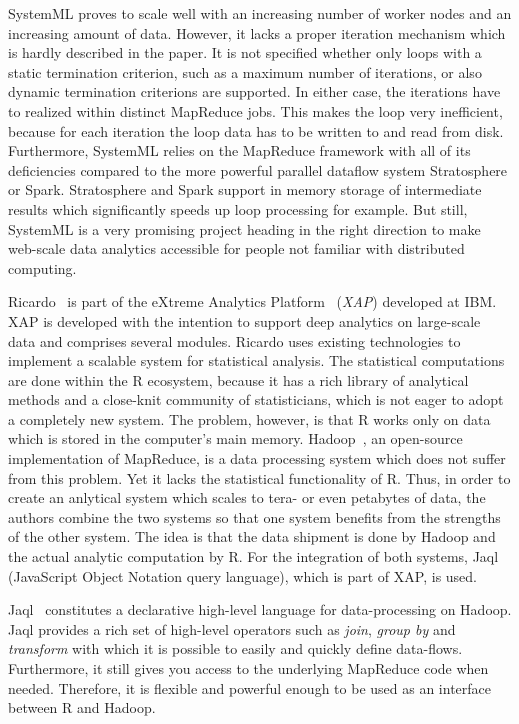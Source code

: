 SystemML proves to scale well with an increasing number of worker nodes and an increasing amount of data.
However, it lacks a proper iteration mechanism which is hardly described in the paper.
It is not specified whether only loops with a static termination criterion, such as a maximum number of iterations, or also dynamic termination criterions are supported.
In either case, the iterations have to realized within distinct MapReduce jobs.
This makes the loop very inefficient, because for each iteration the loop data has to be written to and read from disk.
Furthermore, SystemML relies on the MapReduce framework with all of its deficiencies compared to the more powerful parallel dataflow system Stratosphere or Spark.
Stratosphere and Spark support in memory storage of intermediate results which significantly speeds up loop processing for example.
But still, SystemML is a very promising project heading in the right direction to make web-scale data analytics accessible for people not familiar with distributed computing.

Ricardo~\cite{das:2010a} is part of the eXtreme Analytics Platform~\cite{balmin:jrd2013a} (\emph{XAP}) developed at IBM.
XAP is developed with the intention to support deep analytics on large-scale data and comprises several modules.
Ricardo uses existing technologies to implement a scalable system for statistical analysis.
The statistical computations are done within the R ecosystem, because it has a rich library of analytical methods and a close-knit community of statisticians, which is not eager to adopt a completely new system.
The problem, however, is that R works only on data which is stored in the computer's main memory.
Hadoop~\cite{hadoop:2008a}, an open-source implementation of MapReduce, is a data processing system which does not suffer from this problem.
Yet it lacks the statistical functionality of R.
Thus, in order to create an anlytical system which scales to tera- or even petabytes of data, the authors combine the two systems so that one system benefits from the strengths of the other system.
The idea is that the data shipment is done by Hadoop and the actual analytic computation by R.
For the integration of both systems, Jaql (JavaScript Object Notation query language), which is part of XAP, is used.

Jaql~\cite{beyer:2011a} constitutes a declarative high-level language for data-processing on Hadoop.
Jaql provides a rich set of high-level operators such as \emph{join}, \emph{group by} and \emph{transform} with which it is possible to easily and quickly define data-flows.
Furthermore, it still gives you access to the underlying MapReduce code when needed.
Therefore, it is flexible and powerful enough to be used as an interface between R and Hadoop.

